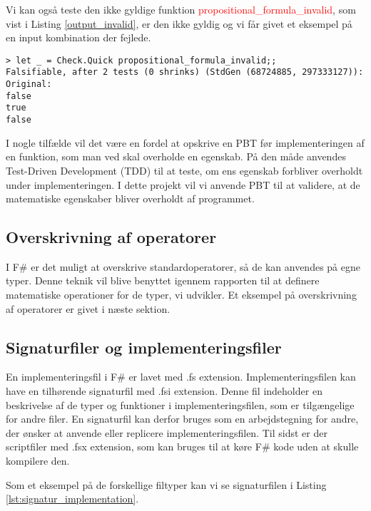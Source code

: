 Vi kan også teste den ikke gyldige funktion \textcolor{red}{propositional\_formula\_invalid}, som vist i Listing \ref{output_invalid}, er den ikke gyldig og vi får givet et eksempel på en input kombination der fejlede.

\begin{lstlisting}[style=output, label={output_invalid}, caption={Output ved PBT af \textcolor{red}{propositional\_formula\_invalid}}]
> let _ = Check.Quick propositional_formula_invalid;;
Falsifiable, after 2 tests (0 shrinks) (StdGen (68724885, 297333127)):
Original:
false
true
false
\end{lstlisting}

I nogle tilfælde vil det være en fordel at opskrive en PBT før implementeringen af en funktion, som man ved skal overholde en egenskab. På den måde anvendes Test-Driven Development (TDD) til at teste, om ens egenskab forbliver overholdt under implementeringen. I dette projekt vil vi anvende PBT til at validere, at de matematiske egenskaber bliver overholdt af programmet.



\subsection{Overskrivning af operatorer}
I F\# er det muligt at overskrive standardoperatorer, så de kan anvendes på egne typer. Denne teknik vil blive benyttet igennem rapporten til at definere matematiske operationer for de typer, vi udvikler. Et eksempel på overskrivning af operatorer er givet i næste sektion.

\subsection{Signaturfiler og implementeringsfiler}
En implementeringsfil i F\# er lavet med .fs extension. Implementeringsfilen kan have en tilhørende signaturfil med .fsi extension. Denne fil indeholder en beskrivelse af de typer og funktioner i implementeringsfilen, som er tilgængelige for andre filer. En signaturfil kan derfor bruges som en arbejdstegning for andre, der ønsker at anvende eller replicere implementeringsfilen. Til sidst er der scriptfiler med .fsx extension, som kan bruges til at køre F\# kode uden at skulle kompilere den.

Som et eksempel på de forskellige filtyper kan vi se signaturfilen i Listing \ref{lst:signatur_implementation}.



